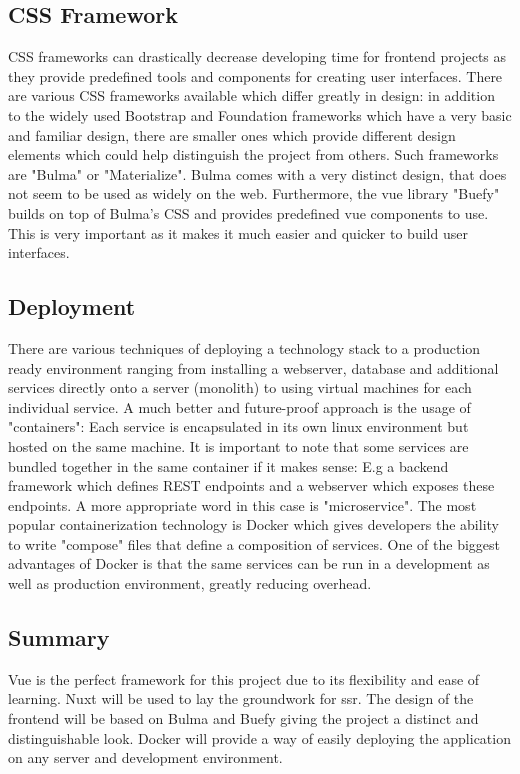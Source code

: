 \subsection{CSS Framework}
CSS frameworks can drastically decrease developing time for frontend projects as they provide predefined tools and components for creating user interfaces. There are various CSS frameworks available which differ greatly in design: in addition to the widely used Bootstrap and Foundation frameworks which have a very basic and familiar design, there are smaller ones which provide different design elements which could help distinguish the project from others. Such frameworks are "Bulma" or "Materialize". Bulma comes with a very distinct design, that does not seem to be used as widely on the web. Furthermore, the vue library "Buefy" builds on top of Bulma's CSS and provides predefined vue components to use. This is very important as it makes it much easier and quicker to build user interfaces.

\subsection{Deployment}
There are various techniques of deploying a technology stack to a production ready environment ranging from installing a webserver, database and additional services directly onto a server (monolith) to using virtual machines for each individual service. A much better and future-proof approach is the usage of "containers": Each service is encapsulated in its own linux environment but hosted on the same machine. It is important to note that some services are bundled together in the same container if it makes sense: E.g a backend framework which defines REST endpoints and a webserver which exposes these endpoints. A more appropriate word in this case is "microservice". The most popular containerization technology is Docker which gives developers the ability to write "compose" files that define a composition of services. One of the biggest advantages of Docker is that the same services can be run in a development as well as production environment, greatly reducing overhead.

\subsection{Summary}
Vue is the perfect framework for this project due to its flexibility and ease of learning. Nuxt will be used to lay the groundwork for \acrshort{ssr}. The design of the frontend will be based on Bulma and Buefy giving the project a distinct and distinguishable look. Docker will provide a way of easily deploying the application on any server and development environment.

